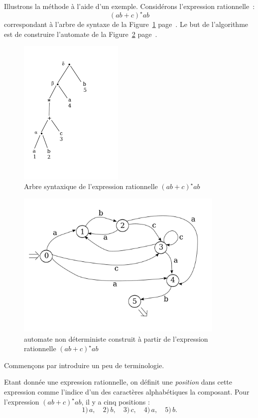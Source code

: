 Illustrons la m{\'e}thode {\`a} l'aide d'un exemple. Consid\'erons l'expression rationnelle~: 
\[ (ab+c)^\star ab \] correspondant {\`a} l'arbre de syntaxe de la Figure~\ref{as} page~\pageref{as}. 
Le but de l'algorithme est de construire l'automate de la Figure~\ref{au} page~\pageref{au}.
\begin{figure}
\begin{center}
  \includegraphics[width=5cm]{arbre}
\caption{\label{as} Arbre syntaxique de l'expression rationnelle $(ab+c)^\star ab$}
\end{center}
\end{figure}
\begin{figure}
\begin{center}
\includegraphics[width=10cm]{automate}
\caption{\label{au} automate non d{\'e}terministe construit {\`a} partir de l'expression rationnelle $(ab+c)^\star ab$}
\end{center}
\end{figure}
Commen\c{c}ons par introduire un peu de terminologie.
\begin{definition}
Etant donn{\'e}e une expression rationnelle, on d{\'e}finit une \emph{position} dans cette expression comme l'indice d'un des 
caract{\`e}res alphab{\'e}tiques la composant. 
Pour l'expression $(ab+c)^\star ab$, il y a cinq positions : 
\[ 1) \, a,  \quad 2) \, b, \quad 3) \, c, \quad 4) \, a, \quad 5)\, b.\]
\end{definition}

